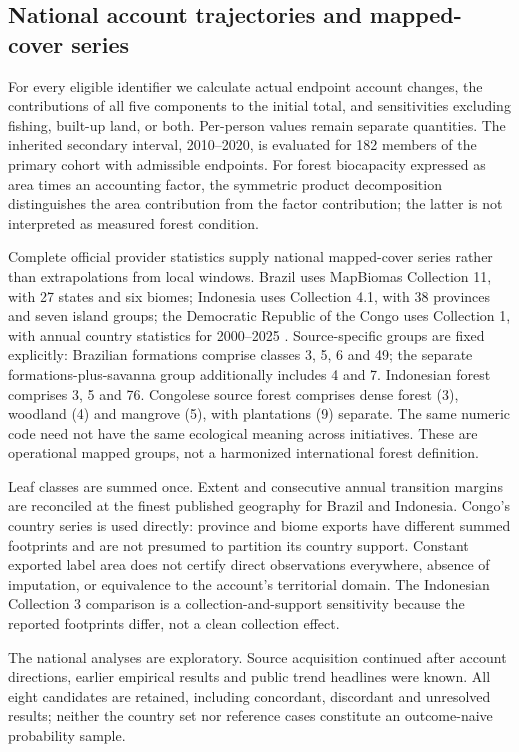 \subsection{National account trajectories and mapped-cover series}\label{sec:nationalmethods}
For every eligible identifier we calculate actual endpoint account changes, the contributions of all five components to the initial total, and sensitivities excluding fishing, built-up land, or both. Per-person values remain separate quantities. The inherited secondary interval, 2010--2020, is evaluated for 182 members of the primary cohort with admissible endpoints. For forest biocapacity expressed as area times an accounting factor, the symmetric product decomposition distinguishes the area contribution from the factor contribution; the latter is not interpreted as measured forest condition.

Complete official provider statistics supply national mapped-cover series rather than extrapolations from local windows. Brazil uses MapBiomas Collection 11, with 27 states and six biomes; Indonesia uses Collection 4.1, with 38 provinces and seven island groups; the Democratic Republic of the Congo uses Collection 1, with annual country statistics for 2000--2025 \citep{MapBiomas2026,MapBiomasIDN2026,MapBiomasCOD2026}. Source-specific groups are fixed explicitly: Brazilian formations comprise classes 3, 5, 6 and 49; the separate formations-plus-savanna group additionally includes 4 and 7. Indonesian forest comprises 3, 5 and 76. Congolese source forest comprises dense forest (3), woodland (4) and mangrove (5), with plantations (9) separate. The same numeric code need not have the same ecological meaning across initiatives. These are operational mapped groups, not a harmonized international forest definition.

Leaf classes are summed once. Extent and consecutive annual transition margins are reconciled at the finest published geography for Brazil and Indonesia. Congo's country series is used directly: province and biome exports have different summed footprints and are not presumed to partition its country support. Constant exported label area does not certify direct observations everywhere, absence of imputation, or equivalence to the account's territorial domain. The Indonesian Collection 3 comparison is a collection-and-support sensitivity because the reported footprints differ, not a clean collection effect.

The national analyses are exploratory. Source acquisition continued after account directions, earlier empirical results and public trend headlines were known. All eight candidates are retained, including concordant, discordant and unresolved results; neither the country set nor reference cases constitute an outcome-naive probability sample.

